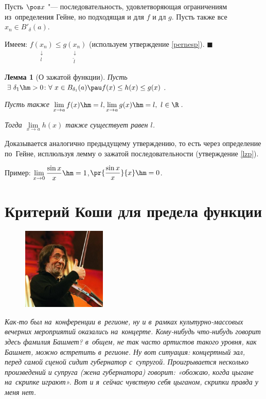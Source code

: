 \documentclass[a4paper,10pt,twoside]{article}
\newtheorem{Th}{Лемма}[section]
\newenvironment{Proof}
       {\par\noindent{\textbf{Доказательство.}}}
       {\hfill$\scriptstyle\blacksquare$}
\let\AVsection\section{}
\renewcommand\section{\newpage\scol\AVsection}
\newcommand{\scol}{  \renewcommand{\headrulewidth}{0.5pt}\fancyhead[RE,LO]{\thesection{} \leftmark} \fancyhead[LE,RO]{\thepage}}
\begin{document}
\begin{Proof}
Пусть $\pos x$ "--- последовательность, удовлетворяющая ограничениям из~определения Гейне,
 но подходящая и для $f$ и дл $g$. Пусть также все $x_n\in B'_\delta(a)$.

Имеем: $\underset{\begin{smallmatrix} \downarrow\\l\end{smallmatrix}}{f(x_n)}\leq
\underset{\begin{smallmatrix} \downarrow\\ \tilde l\end{smallmatrix}}{g(x_n)}$ (используем утверждение \ref{pernesp}).
\end{Proof}

\begin{Th}[О зажатой функции]\label{zaf}
Пусть $\exists\ \delta_1\hm>0\colon \forall\  x\in B_{\delta_1}(a)
\pau f(x)\leq h(x)\leq g(x)$.

Пусть также $
\lim\limits_{x\to a}f(x)\hm=l,
\lim\limits_{x\to a}g(x)\hm=l,\ l\in\R$.

Тогда $\lim\limits_{x\to a}h(x)$ также существует равен $l$.
\end{Th}

Доказывается аналогично предыдущему утверждению, то есть через определение по~Гейне, исплюльзуя лемму о зажатой последовательности (утверждение \ref{lzp}).

Пример: $\lim\limits_{x\to0}\dfrac{\sin x}{x}\hm=1$,\pau $\pr{\dfrac{\sin x}{x}}{x}\hm=0$.




\section{Критерий Коши для предела функции}

\begin{figure}
\vspace{-20pt}
\includegraphics[width=4cm]{img/final/galat/petr.jpg}\vspace{-8pt}
   \end{figure}\textit{Как-то был на~конференции в~регионе, ну и в~рамках культурно-массовых
    вечерних мероприятий оказались на~концерте. 
    Кому-нибудь что-нибудь говорит здесь фамилия Башмет? в~общем, не так часто артистов такого уровня, как Башмет,
     можно встретить в~регионе. Ну вот ситуация: концертный зал, перед самой сценой сидит губернатор с~супругой.
      Проигрывается несколько произведений и супруга (жена губернатора) говорит: «обожаю, когда цыгане на~скрипке играют». 
      Вот и я~сейчас чувствую себя цыганом, скрипки правда у меня нет.}
\end{document}
